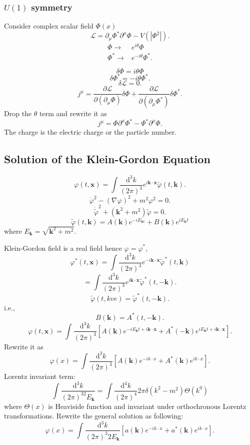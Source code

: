 \subsubsection*{$U(1)$ symmetry}
Consider complex scalar field $\Phi(x)$
\[
  \mathcal{L}=\partial_\mu\Phi^{*}\partial^{\mu}\Phi-V(\left| \Phi^2 \right|)  
.\] 
\begin{align*}
  \Phi\to & e^{i\theta}\Phi\\
  \Phi^{*}\to & e^{-i\theta}\Phi^{*}
.\end{align*}

\[
\delta\Phi=i\theta\Phi
\] 
\[
\delta\Phi^{*}=-i\theta\Phi^{*}
.\] 
\[
\delta \mathcal{L}=0
.\] 
\[
  j^{\mu}=\frac{\partial \mathcal{L}}{\partial (\partial_\mu\Phi)}\delta\Phi+\frac{\partial \mathcal{L}}{\partial (\partial_\mu\Phi^{*})} \delta\Phi^{*} 
.\]
Drop the $\theta$ term and rewrite it as
\[
j^{\mu}=\Phi\partial^{\mu}\Phi^{*}-\Phi^{*}\partial^{\mu}\Phi
.\]
The charge is the  electric charge or the particle number.

\subsection{Solution of the  Klein-Gordon Equation}
\[
  \varphi(t,\mathbf{x})=\int \frac{\mathrm{d}^3k}{(2\pi)^3}e^{i \mathbf{k}\cdot \mathbf{x}}\tilde{\varphi}(t,\mathbf{k})
.\]
\[
  \dot{\varphi}^2-(\nabla \varphi)^2+m^2\varphi^2=0		
.\]
\[
  \dot{\tilde{\varphi}}^2+(\mathbf{k}^2+m^2)\tilde{\varphi}=0
.\] 
\[
  \tilde{\varphi}(t,\mathbf{k})=A(\mathbf{k})e^{-iE_{\mathbf{k}t}}+B(\mathbf{k})e^{iE_{\mathbf{k}}t}
\] 
where $E_{\mathbf{k}}=\sqrt{\mathbf{k}^2+m^2} $.

Klein-Gordon field is a real field hence $\varphi=\varphi^{*}$, 
\[
  \varphi^*(t,\mathbf{x})=\int \frac{\mathrm{d}^3k}{(2\pi)^3}e^{-i\mathbf{k}\cdot \mathbf{x}}\tilde{\varphi}^*(t,\mathbf{k})
\]
\[
  =\int \frac{\mathrm{d}^3k}{(2\pi)^3}e^{i\mathbf{k}\cdot \mathbf{x}}\tilde{\varphi}^{*}(t,-\mathbf{k})
.\] 
\[
  \tilde{\varphi}(t,kve)=\tilde{\varphi}^{*}(t,-\mathbf{k})
.\] 
i.e.,
\[
  B(\mathbf{k})=A^{*}(t,-\mathbf{k})
.\] 
\[
  \varphi(t,\mathbf{x})=\int \frac{\mathrm{d}^3k}{(2\pi)^3}\left[ A(\mathbf{k})e^{-iE_{\mathbf{k}}t+i\mathbf{k}\cdot \mathbf{x}}+A^{*}(-\mathbf{k})e^{iE_{\mathbf{k}}t+i\mathbf{k}\cdot \mathbf{x}} \right] 
.\]
Rewrite it as 
\[
  \varphi(x)=\int \frac{\mathrm{d}^3k}{(2\pi)^3}\left[ A(\mathbf{k})e^{-ik\cdot x}+A^{*}(\mathbf{k})e^{ik\cdot x} \right] 
.\] 
Lorentz invariant term:
\[
  \int\frac{\mathrm{d}^3k}{(2\pi)^32E_{\mathbf{k}}}=\int \frac{\mathrm{d}^{4}k}{(2\pi)^{4}}2\pi\delta(k^2-m^2)\Theta(k^0)
\]
where $\Theta\left( x \right) $ is Heaviside function and invariant under orthochronous Lorentz transformations.
Rewrite the general solution as following:
 \[
   \varphi(x)=\int \frac{\mathrm{d}^3k}{(2\pi)^3 2E_{\mathbf{k}}}\left[ a(\mathbf{k})e^{-ik\cdot x}+a^{*}(\mathbf{k})e^{ik\cdot x} \right] 
.\] 

